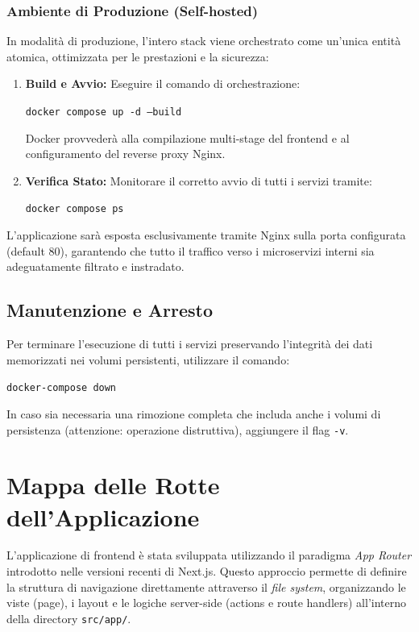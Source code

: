\documentclass[12pt,a4paper]{report}
\begin{document}
\subsection{Ambiente di Produzione (Self-hosted)}
In modalità di produzione, l'intero stack viene orchestrato come un'unica
entità atomica, ottimizzata per le prestazioni e la sicurezza:

\begin{enumerate}
  \item \textbf{Build e Avvio:} Eseguire il comando di orchestrazione:
    \begin{center}
      \texttt{docker compose up -d --build}
    \end{center}
    Docker provvederà alla compilazione multi-stage del frontend e al
    configuramento del reverse proxy Nginx.

  \item \textbf{Verifica Stato:} Monitorare il corretto avvio di tutti i
    servizi tramite:
    \begin{center}
      \texttt{docker compose ps}
    \end{center}
\end{enumerate}

L'applicazione sarà esposta esclusivamente tramite Nginx sulla porta configurata
(default 80), garantendo che tutto il traffico verso i microservizi interni sia
adeguatamente filtrato e instradato.

\section{Manutenzione e Arresto}
Per terminare l'esecuzione di tutti i servizi preservando l'integrità dei dati
memorizzati nei volumi persistenti, utilizzare il comando:
\begin{center}
  \texttt{docker-compose down}
\end{center}
In caso sia necessaria una rimozione completa che includa anche i volumi di
persistenza (attenzione: operazione distruttiva), aggiungere il flag
\texttt{-v}.

\chapter{Mappa delle Rotte dell'Applicazione}
\label{app:routes}
L'applicazione di frontend è stata sviluppata utilizzando il
paradigma \textit{App Router} introdotto nelle versioni recenti di
Next.js. Questo approccio permette di definire la struttura di
navigazione direttamente attraverso il \textit{file system},
organizzando le viste (page), i layout e le logiche server-side
(actions e route handlers) all'interno della directory \texttt{src/app/}.
\end{document}
